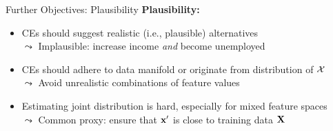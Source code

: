 \documentclass[10pt,compress,t,notes=noshow, xcolor=table]{beamer}
\begin{document}
\begin{frame}{Further Objectives: Plausibility}
		\textbf{Plausibility:}
		\begin{itemize}
			\item<1-> CEs should suggest realistic (i.e., plausible) alternatives\\
			$\leadsto$ Implausible: increase income \emph{and} become unemployed
			\item<2-> CEs should adhere to data manifold or originate from distribution of $\mathcal{X}$\\
			$\leadsto$ Avoid unrealistic combinations of feature values
			\item<3-> Estimating joint distribution is hard, especially for mixed feature spaces\\
			$\leadsto$ Common proxy: ensure that $\mathbf{x}'$ is close to training data $\mathbf{X}$
		\end{itemize}	
\end{frame}
\end{document}
